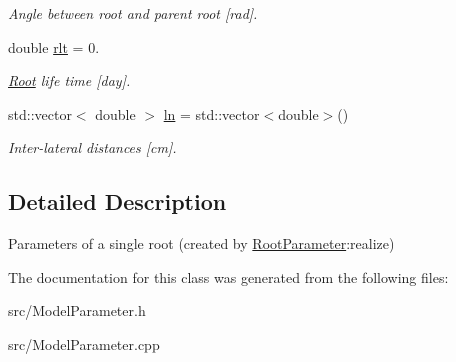 \begin{DoxyCompactItemize}
\begin{DoxyCompactList}\small\item\em Angle between root and parent root \mbox{[}rad\mbox{]}. \end{DoxyCompactList}\item 
\mbox{\label{classCPlantBox_1_1RootParameter_a4467193ef1fc618290766b77f801f1f1}} 
double \hyperlink{classCPlantBox_1_1RootParameter_a4467193ef1fc618290766b77f801f1f1}{rlt} = 0.
\begin{DoxyCompactList}\small\item\em \hyperlink{classCPlantBox_1_1Root}{Root} life time \mbox{[}day\mbox{]}. \end{DoxyCompactList}\item 
\mbox{\label{classCPlantBox_1_1RootParameter_a999299a0b4f326adf683afe5da9423a9}} 
std\+::vector$<$ double $>$ \hyperlink{classCPlantBox_1_1RootParameter_a999299a0b4f326adf683afe5da9423a9}{ln} = std\+::vector$<$double$>$()
\begin{DoxyCompactList}\small\item\em Inter-\/lateral distances \mbox{[}cm\mbox{]}. \end{DoxyCompactList}\end{DoxyCompactItemize}


\subsection{Detailed Description}
Parameters of a single root (created by \hyperlink{classCPlantBox_1_1RootParameter}{Root\+Parameter}\+:realize) 

The documentation for this class was generated from the following files\+:\begin{DoxyCompactItemize}
\item 
src/Model\+Parameter.\+h\item 
src/Model\+Parameter.\+cpp\end{DoxyCompactItemize}

